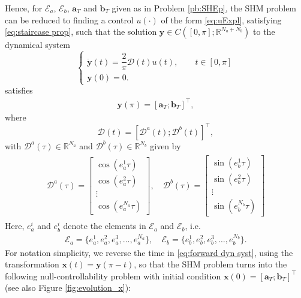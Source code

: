 \documentclass[twocolumn]{autart}    %
\begin{document}
Hence, for $\mathcal{E}_a$, $\mathcal{E}_b$, $\bm{a}_T$ and $\bm{b}_T$ given as in Problem \ref{pb:SHEp}, the SHM problem can be reduced to finding a control $u(\cdot)$ of the form \eqref{eq:uExpl}, satisfying \eqref{eq:staircase prop}, such that the solution $\bm{y} \in C([0,\pi]; \mathbb{R}^{N_a+N_b})$ to the dynamical system
\begin{equation}\label{eq:forward dyn syst}
	\begin{cases}
		\dot{\bm{y}}(t) = \dfrac{2}{\pi} \bm{\mathcal{D}}(t) u(t), \qquad  t\in [0,\pi]
		\\[5pt]
		\bm{y}(0) = 0.
	\end{cases}
\end{equation}
satisfies
\begin{align*}
	\bm{y} (\pi) = [\bm{a}_T;\bm{b}_T]^\top,	
\end{align*}
where
\begin{equation}\label{eq:Dynamics}
	\bm{\mathcal{D}}(t) = \left[ \bm{\mathcal{D}}^a(t); \bm{\mathcal{D}}^b(t) \right]^\top, 
\end{equation}
with $\bm{\mathcal{D}}^a(\tau) \in \mathbb{R}^{N_a} $ and $ \bm{\mathcal{D}}^b(\tau) \in \mathbb{R}^{N_b}$ given by
\begin{gather}\label{eq:DalphaDbeta}
    \begin{align}
        \bm{\mathcal{D}}^a(\tau) = 
        \begin{bmatrix} 
            \cos(e_a^1\tau) \\ \cos(e_a^2\tau) \\ \vdots \\ \cos(e_a^{N_a}\tau) 
        \end{bmatrix},
        \quad \bm{\mathcal{D}}^b(\tau) = 
        \begin{bmatrix} 
            \sin(e_b^1\tau) \\ \sin(e_b^2\tau) \\ \vdots \\ \sin(e_b^{N_b}\tau)
        \end{bmatrix} 
    \end{align} 
\end{gather}
Here, $e_a^i$ and $e_b^i$  denote the elements in $\mathcal{E}_a$ and  $\mathcal{E}_b$, i.e.
\begin{align*}
	\mathcal{E}_a = \{e_a^1,e_a^2,e_a^3,\dots,e_a^{N_a}\}, \quad \mathcal{E}_b = \{e_b^1,e_b^2,e_b^3,\dots,e_b^{N_b}\}.
\end{align*}
For notation simplicity, we reverse the time in \eqref{eq:forward dyn syst}, using the transformation $\bm{x} (t) = \bm{y}(\pi - t)$, so that the SHM problem turns into the following null-controllability problem with initial condition $\bm{x}(0) = [\bm{a}_T; \bm{b}_T]^\top$ (see also Figure \ref{fig:evolution_x}):
\end{document}
